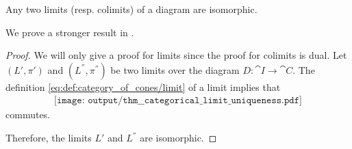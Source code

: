 \begin{lemma}\label{thm:categorical_limit_uniqueness_lemma}
  Any two limits (resp. colimits) of a diagram are isomorphic.

  We prove a stronger result in .
\end{lemma}
\begin{proof}
  We will only give a proof for limits since the proof for colimits is dual. Let \( (L', \pi') \) and \( (L^\dprime, \pi^\dprime) \) be two limits over the diagram \( D: \cat{I} \to \cat{C} \). The definition \eqref{eq:def:category_of_cones/limit} of a limit implies that
  \begin{equation}\label{eq:thm:categorical_limit_uniqueness}
    \begin{aligned}
      \texttt{[image: output/thm\_\_categorical\_limit\_uniqueness.pdf]}
    \end{aligned}
  \end{equation}
  commutes.

  Therefore, the limits \( L' \) and \( L^\dprime \) are isomorphic.
\end{proof}

